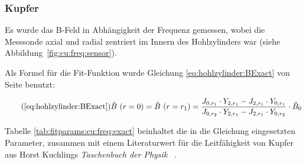 {%
    \clearpage
    \pdfpagewidth
	\textwidth
    \addtolength{\textwidth}{70mm}

    \subsubsection{Kupfer}
    \label{sec:ausw:subsec:hohlz:subsubsec:copper}

	\begin{minipage}[t]{0.33\textwidth}
        \vspace{0pt}



        Es wurde das B-Feld in Abh\"angigkeit der Frequenz gemessen, wobei die
        Messsonde axial und  radial zentriert im Innern  des Hohlzylinders war
        (siehe Abbildung~\ref{fig:cu:freq:sensor}).

        Als       Formel       f\"ur        die       Fit-Funktion       wurde
        Gleichung        \ref{eq:hohlzylinder:BExact}         von        Seite
        \pageref{eq:hohlzylinder:BExact} benutzt:

        \begin{equation}
            \tag{\ref{eq:hohlzylinder:BExact}}
            \hat{B}~(r = 0) = \hat{B}~(r = r_1) = \frac{J_{0,r_1} \cdot Y_{2,r_1} - J_{2,r_1} \cdot Y_{0,r_1}}{J_{0,r_2} \cdot Y_{2,r_1} - J_{2,r_1} \cdot Y_{0,r_2}} \cdot \hat{B}_0 \\
        \end{equation}

        Tabelle  \ref{tab:fitparams:cu:freq:exact}   beinhaltet  die   in  die
        Gleichung  eingesetzten Parameter,  zusammen  mit einem  Literaturwert
        f\"ur   die   Leitf\"ahigkeit   von   Kupfer   aus   Horst   Kuchlings
        \emph{Taschenbuch der Physik} ~\cite{ref:kuchling:resistivityTable}.

        \vspace{1em}


\end{minipage}}
